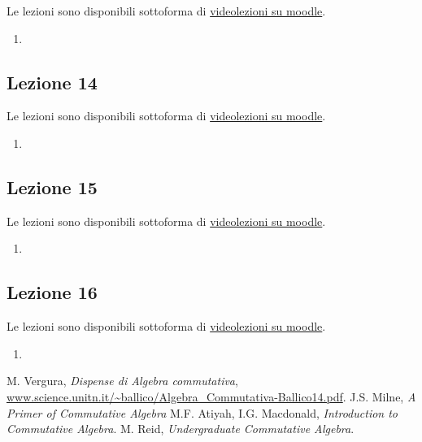 \documentclass[italian]{article}
\begin{document}
	Le lezioni sono disponibili sottoforma di 
	\href{https://didatticaonline.unitn.it/dol/course/view.php?id=23268}{videolezioni
		su moodle}.
	
	\begin{enumerate}
		\item 
	\end{enumerate}   

	\subsection{Lezione 14}
	
	Le lezioni sono disponibili sottoforma di 
	\href{https://didatticaonline.unitn.it/dol/course/view.php?id=23268}{videolezioni
		su moodle}.
	
	\begin{enumerate}
		\item 
	\end{enumerate}  

	\subsection{Lezione 15}
	
	Le lezioni sono disponibili sottoforma di 
	\href{https://didatticaonline.unitn.it/dol/course/view.php?id=23268}{videolezioni
		su moodle}.
	
	\begin{enumerate}
		\item 
	\end{enumerate}  

	\subsection{Lezione 16}
	
	Le lezioni sono disponibili sottoforma di 
	\href{https://didatticaonline.unitn.it/dol/course/view.php?id=23268}{videolezioni
		su moodle}.
	
	\begin{enumerate}
		\item 
	\end{enumerate}  

    \begin{thebibliography}{9}
       M. Vergura, \textit{Dispense di Algebra commutativa},
        \url{www.science.unitn.it/~ballico/Algebra_Commutativa-Ballico14.pdf}.
       J.S. Milne, \textit{A Primer of Commutative Algebra}
       M.F. Atiyah, I.G. Macdonald, \textit{Introduction to 
            Commutative Algebra}.
       M. Reid, \textit{Undergraduate Commutative Algebra}.
    \end{thebibliography}
\end{document}
